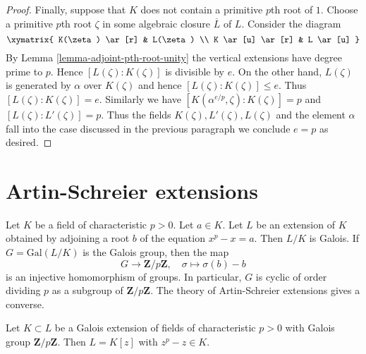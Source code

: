 \begin{proof}
\medskip\noindent
Finally, suppose that $K$ does not contain a primitive
$p$th root of $1$.
Choose a primitive $p$th root $\zeta$ in some algebraic closure
$\overline{L}$ of $L$. Consider the diagram
$$
\xymatrix{
K(\zeta) \ar[r] & L(\zeta) \\
K \ar[u] \ar[r] & L \ar[u]
}
$$
By Lemma \ref{lemma-adjoint-pth-root-unity}
the vertical extensions have degree prime to $p$.
Hence $[L(\zeta) : K(\zeta)]$ is divisible by $e$.
On the other hand, $L(\zeta)$ is generated by $\alpha$
over $K(\zeta)$ and hence $[L(\zeta) : K(\zeta)] \leq e$.
Thus $[L(\zeta) : K(\zeta)] = e$. Similarly we have
$[K(\alpha^{e/p}, \zeta) : K(\zeta)] = p$ and
$[L(\zeta) : L'(\zeta)] = p$. Thus the fields
$K(\zeta), L'(\zeta), L(\zeta)$ and the element $\alpha$
fall into the case discussed
in the previous paragraph we conclude $e = p$ as desired.
\end{proof}




\section{Artin-Schreier extensions}
\label{section-Artin-Schreier}

\noindent
Let $K$ be a field of characteristic $p > 0$. Let $a \in K$. Let $L$ be an
extension of $K$ obtained by adjoining a root $b$ of the equation
$x^p - x = a$. Then $L/K$ is Galois. If $G = \text{Gal}(L/K)$ is the Galois
group, then the map
$$
G \longrightarrow \mathbf{Z}/p\mathbf{Z},\quad
\sigma \longmapsto \sigma(b) - b
$$
is an injective homomorphism of groups. In particular, $G$ is cyclic
of order dividing $p$ as a subgroup of $\mathbf{Z}/p\mathbf{Z}$.
The theory of Artin-Schreier extensions gives a converse.

\begin{lemma}
\label{lemma-Artin-Schreier}
Let $K \subset L$ be a Galois extension of fields of characteristic $p > 0$
with Galois group $\mathbf{Z}/p\mathbf{Z}$. Then $L = K[z]$ with
$z^p - z \in K$.
\end{lemma}


